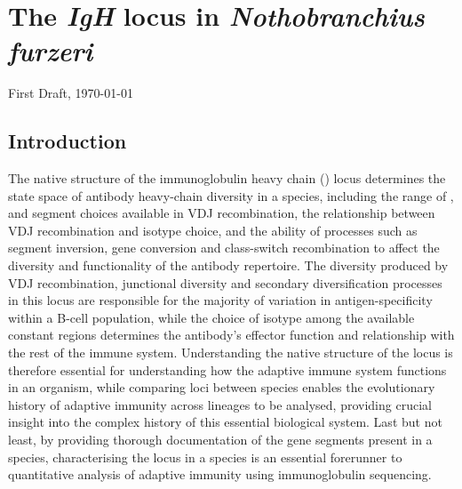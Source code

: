 
\chapter{The \textit{IgH} locus in \textit{Nothobranchius furzeri}}  
\onehalfspacing

{\LARGE First Draft, \today}

\renewcommand{\floatpagefraction}{.85}%
\renewcommand{\topfraction}{.85}%

%
%
\pagebreak


\section{Introduction} %

The native structure of the immunoglobulin heavy chain (\igh{}) locus determines the state space of antibody heavy-chain diversity in a species, including the range of \vh, \dh and \jh segment choices available in VDJ recombination, the relationship between VDJ recombination and isotype choice, and the ability of processes such as segment inversion, gene conversion and class-switch recombination to affect the diversity and functionality of the antibody repertoire. The diversity produced by VDJ recombination, junctional diversity and secondary diversification processes in this locus are responsible for the majority of variation in antigen-specificity within a B-cell population, while the choice of isotype among the available \igh{} constant regions determines the antibody's effector function and relationship with the rest of the immune system. Understanding the native structure of the \igh{} locus is therefore essential for understanding how the adaptive immune system functions in an organism, while comparing loci between species enables the evolutionary history of adaptive immunity across lineages to be analysed, providing crucial insight into the complex history of this essential biological system. Last but not least, by providing thorough documentation of the \igh{} gene segments present in a species, characterising the \igh{} locus in a species is an essential forerunner to quantitative analysis of adaptive immunity using immunoglobulin sequencing. %

